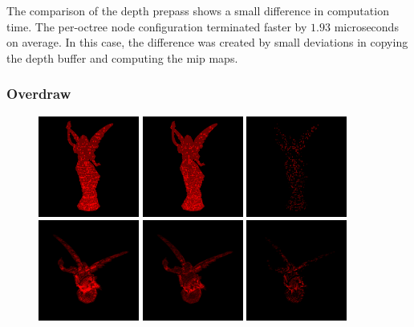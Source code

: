 \noindent
The comparison of the depth prepass shows a small difference in computation time. The per-octree node configuration 
terminated faster by $1.93$ microseconds on average. In this case, the difference was created by small deviations in 
copying the depth buffer and computing the mip maps. 

\subsubsection*{Overdraw}

\begin{figure}[!htb]
  \centering
  \includegraphics[height=125px]{images/graphics/overdraw-lucy1-pooc.png}
  \includegraphics[height=125px]{images/graphics/overdraw-lucy1-pmoc.png}
  \includegraphics[height=125px]{images/graphics/overdraw-lucy1-diff.png}
  \includegraphics[height=125px]{images/graphics/overdraw-lucy2-pooc.png}
  \includegraphics[height=125px]{images/graphics/overdraw-lucy2-pmoc.png}
  \includegraphics[height=125px]{images/graphics/overdraw-lucy2-diff.png}
  \caption{}
  \label{fig:lucy-overdraw}
\end{figure}

